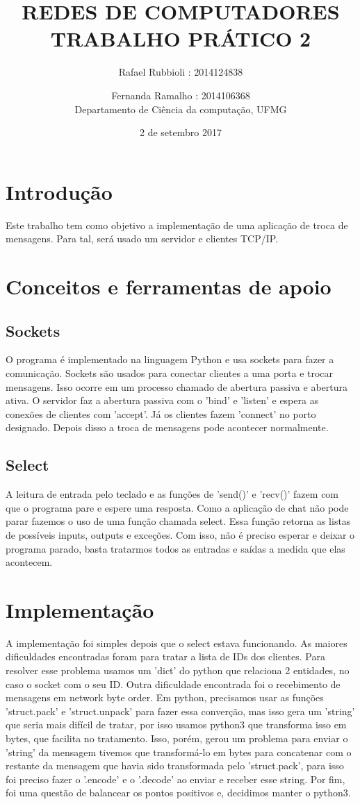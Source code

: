 \documentclass[10pt]{article}
\title{\LARGE \textbf{\uppercase{REDES DE COMPUTADORES\\Trabalho prático 2}} }
\date{2 de setembro 2017}
\author{Rafael Rubbioli : 2014124838\\
\and Fernanda Ramalho : 2014106368 \\ Departamento de Ciência da computação, UFMG}
\begin{document}
	\maketitle 
	\section{Introdução}
	Este trabalho tem como objetivo a implementação de uma aplicação de troca de mensagens. Para tal, será usado um servidor e clientes TCP/IP.
	\section{Conceitos e ferramentas de apoio}
	\subsection{Sockets}	
	O programa é implementado na linguagem Python e usa sockets para fazer a comunicação. Sockets são usados para conectar clientes a uma porta e trocar mensagens. Isso ocorre em um processo chamado de abertura passiva e abertura ativa. O servidor faz a abertura passiva com o 'bind' e 'listen' e espera as conexões de clientes com 'accept'. Já os clientes fazem 'connect' no porto designado. Depois disso a troca de mensagens pode acontecer normalmente.
	\subsection{Select}
	A leitura de entrada pelo teclado e as funções de 'send()' e 'recv()' fazem com que o programa pare e espere uma resposta. Como a aplicação de chat não pode parar fazemos o uso de uma função chamada select. Essa função retorna as listas de possíveis inputs, outputs e exceções. Com isso, não é preciso esperar e deixar o programa parado, basta tratarmos todos as entradas e saídas a medida que elas acontecem.
	\section{Implementação}
	A implementação foi simples depois que o select estava funcionando. As maiores dificuldades encontradas foram para tratar a lista de IDs dos clientes. Para resolver esse problema usamos um 'dict' do python que relaciona 2 entidades, no caso o socket com o seu ID. 
	\newline Outra dificuldade encontrada foi o recebimento de mensagens em network byte order. Em python, precisamos usar as funções 'struct.pack' e 'struct.unpack' para fazer essa converção, mas isso gera um 'string' que seria mais difícil de tratar, por isso usamos python3 que transforma isso em bytes, que facilita no tratamento. Isso, porém, gerou um problema para enviar o 'string' da mensagem tivemos que transformá-lo em bytes para concatenar com o restante da mensagem que havia sido transformada pelo 'struct.pack', para isso foi preciso fazer o '.encode' e o '.decode' ao enviar e receber esse string. Por fim, foi uma questão de balancear os pontos positivos e, decidimos manter o python3.
	
\end{document}
